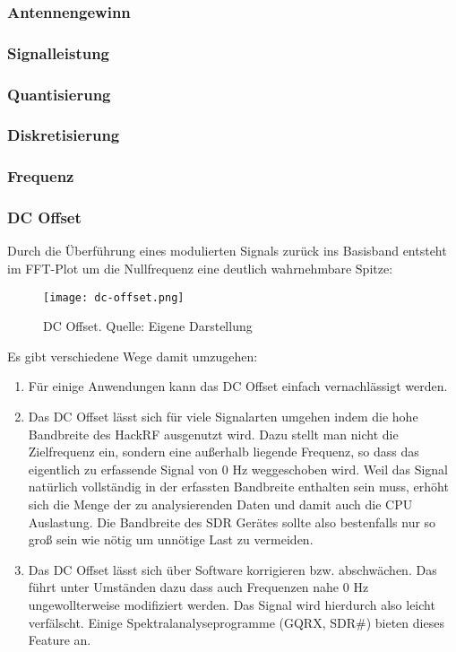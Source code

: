 \subsubsection{Antennengewinn}
\subsubsection{Signalleistung}
\subsubsection{Quantisierung}
\subsubsection{Diskretisierung}
\subsubsection{Frequenz}
\subsubsection{DC Offset}
Durch die Überführung eines modulierten Signals zurück ins Basisband entsteht im FFT-Plot um die Nullfrequenz eine deutlich wahrnehmbare Spitze:
\begin{figure}[ht]
	\centering
	\texttt{[image: dc-offset.png]}
	\caption[DC Offset]{DC Offset. Quelle: Eigene Darstellung} 
	\label{dc-offset}
\end{figure}

Es gibt verschiedene Wege damit umzugehen:
\begin{enumerate}
	\item Für einige Anwendungen kann das DC Offset einfach vernachlässigt werden.
	\item Das DC Offset lässt sich für viele Signalarten umgehen indem die hohe Bandbreite des HackRF ausgenutzt wird. 
	Dazu stellt man nicht die Zielfrequenz ein, sondern eine außerhalb liegende Frequenz, so dass das eigentlich zu erfassende Signal von 0 Hz  weggeschoben wird. Weil das Signal natürlich vollständig in der erfassten Bandbreite enthalten sein muss, erhöht sich die Menge der zu analysierenden Daten und damit auch die CPU Auslastung. Die Bandbreite des SDR Gerätes sollte also bestenfalls nur so groß sein wie nötig um unnötige Last zu vermeiden.
	\item Das DC Offset lässt sich über Software korrigieren bzw. abschwächen. Das führt unter Umständen dazu dass auch Frequenzen nahe 0 Hz ungewollterweise modifiziert werden. Das Signal wird hierdurch also leicht verfälscht. Einige Spektralanalyseprogramme (GQRX, SDR\#) bieten dieses Feature an.
\end{enumerate}


